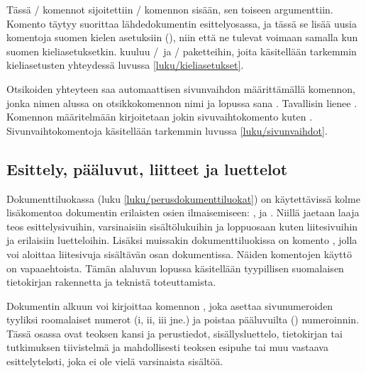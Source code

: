 Tässä \-/ komennot sijoitettiin \-/
komennon sisään, sen toiseen argumenttiin. Komento 
täytyy suorittaa lähdedokumentin esittelyosassa, ja tässä se lisää uusia
komentoja suomen kielen asetuksiin (), niin
että ne tulevat voimaan samalla kun suomen kieliasetuksetkin.
 kuuluu \-/\ ja \-/
paketteihin, joita käsitellään tarkemmin kieliasetusten yhteydessä
luvussa \ref{luku/kieliasetukset}.

Otsikoiden yhteyteen saa automaattisen sivunvaihdon määrittämällä
komennon, jonka nimen alussa on otsikkokomennon nimi ja lopussa sana
. Tavallisin lienee . Komennon
määritelmään kirjoitetaan jokin sivuvaihtokomento kuten
. Sivunvaihtokomentoja käsitellään tarkemmin luvussa
\ref{luku/sivunvaihdot}.

\begin{koodilohkosis}
\newcommand{\sectionbreak}{\clearpage}
\end{koodilohkosis}

\subsection{Esittely, pääluvut, liitteet ja luettelot}
\label{luku/frontmainbackmatter}

Dokumenttiluokassa  (luku \ref{luku/perusdokumenttiluokat})
on käytettävissä kolme lisäkomentoa dokumentin erilaisten osien
ilmaisemiseen: ,  ja
. Niillä jaetaan laaja teos esittelysivuihin,
varsinaisiin sisältölukuihin ja loppuosaan kuten liitesivuihin ja
erilaisiin luetteloihin. Lisäksi muissakin dokumenttiluokissa on komento
, jolla voi aloittaa liitesivuja sisältävän osan
dokumentissa. Näiden komentojen käyttö on vapaaehtoista. Tämän alaluvun
lopussa käsitellään tyypillisen suomalaisen tietokirjan rakennetta ja
teknistä toteuttamista.

Dokumentin alkuun voi kirjoittaa komennon , joka
asettaa sivunumeroiden tyyliksi roomalaiset numerot (i, ii, iii jne.) ja
poistaa pääluvuilta () numeroinnin. Tässä osassa ovat
teoksen kansi ja perustiedot, sisällysluettelo, tietokirjan tai
tutkimuksen tiivistelmä ja mahdollisesti teoksen esipuhe tai muu
vastaava esittelyteksti, joka ei ole vielä varsinaista sisältöä.

